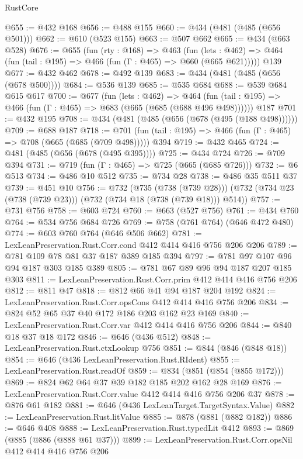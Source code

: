 \begin{lexlean}{RustCore}
\begin{coremodule}
@655 := @432 @168
@656 := @488 @155
@660 := @434 (@481 (@485 (@656 @501)))
@662 := @610 (@523 @155)
@663 := @507 @662
@665 := @434 (@663 @528)
@676 := @655
    (fun (rty : @168) =>
    @463
      (fun (lets : @462) => @464 (fun (tail : @195) => @466 (fun (Γ : @465) => @660 (@665 @621)))))
    @139
@677 := @432 @462
@678 := @492 @139
@683 := @434 (@481 (@485 (@656 (@678 @500))))
@684 := @536 @139
@685 := @535 @684
@688 := @539 @684 @615 @617
@700 := @677
    (fun (lets : @462) =>
    @464 (fun (tail : @195) => @466 (fun (Γ : @465) => @683 (@665 (@685 (@688 @496 @498))))))
    @187
@701 := @432 @195
@708 := @434 (@481 (@485 (@656 (@678 (@495 (@188 @498))))))
@709 := @688 @187
@718 := @701 (fun (tail : @195) => @466 (fun (Γ : @465) => @708 (@665 (@685 (@709 @498))))) @394
@719 := @432 @465
@724 := @481 (@485 (@656 (@678 (@495 @395))))
@725 := @434 @724
@726 := @709 @394
@731 := @719 (fun (Γ : @465) => @725 (@665 (@685 @726)))
@732 := @6 @513
@734 := @486 @10 @512
@735 := @734 @28
@738 := @486 @35 @511 @37
@739 := @451 @10
@756 := @732
    (@735 (@738 (@739 @28)))
    (@732 (@734 @23 (@738 (@739 @23))) (@732 (@734 @18 (@738 (@739 @18))) @514))
@757 := @731 @756
@758 := @603 @724
@760 := @663 (@527 @756)
@761 := @434 @760
@764 := @534 @756 @684 @726
@769 := @758 (@761 @764) (@646 @472 @480)
@774 := @603 @760 @764 (@646 @506 @662)
@781 := LexLeanPreservation.Rust.Corr.cond @412 @414 @416 @756 @206 @206
@789 := @781 @109 @78 @81 @37 @187 @389 @185 @394
@797 := @781 @97 @107 @96 @94 @187 @303 @185 @389
@805 := @781 @67 @89 @96 @94 @187 @207 @185 @303
@811 := LexLeanPreservation.Rust.Corr.prim @412 @414 @416 @756 @206
@812 := @811 @47
@818 := @812 @66 @41 @94 @187 @204 @192
@824 := LexLeanPreservation.Rust.Corr.opsCons @412 @414 @416 @756 @206
@834 := @824 @52 @65 @37 @40 @172 @186 @203 @162 @23 @169
@840 := LexLeanPreservation.Rust.Corr.var @412 @414 @416 @756 @206
@844 := @840 @18 @37 @18 @172
@846 := @646 (@436 @512)
@848 := LexLeanPreservation.Rust.ctxLookup @756
@851 := @844 (@846 (@848 @18))
@854 := @646 (@436 LexLeanPreservation.Rust.RIdent)
@855 := LexLeanPreservation.Rust.readOf
@859 := @834 (@851 (@854 (@855 @172)))
@869 := @824 @62 @64 @37 @39 @182 @185 @202 @162 @28 @169
@876 := LexLeanPreservation.Rust.Corr.value @412 @414 @416 @756 @206 @37
@878 := @876 @61 @182
@881 := @646 (@436 LexLeanTarget.TargetSyntax.Value)
@882 := LexLeanPreservation.Rust.litValue
@885 := @878 (@881 (@882 @182))
@886 := @646 @408
@888 := LexLeanPreservation.Rust.typedLit @412
@893 := @869 (@885 (@886 (@888 @61 @37)))
@899 := LexLeanPreservation.Rust.Corr.opsNil @412 @414 @416 @756 @206

\end{coremodule}
\end{lexlean}
